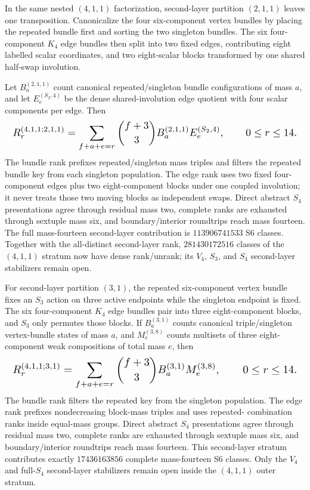 \documentclass{article}
\newcommand{\fitmath}[1]{\resizebox{0.99\linewidth}{!}{$\displaystyle #1$}}
\begin{document}
In the same nested $(4,1,1)$ factorization, second-layer partition
$(2,1,1)$ leaves one transposition. Canonicalize the four six-component vertex
bundles by placing the repeated bundle first and sorting the two singleton
bundles. The six four-component $K_4$ edge bundles then split into two fixed
edges, contributing eight labelled scalar coordinates, and two eight-scalar
blocks transformed by one shared half-swap involution.

Let $B_a^{(2,1,1)}$ count canonical repeated/singleton bundle configurations of
mass $a$, and let $E_e^{(S_2,4)}$ be the dense shared-involution edge quotient
with four scalar components per edge. Then
\begin{equation}
  \fitmath{%
    R_r^{(4,1,1;2,1,1)}=
      \sum_{f+a+e=r}{f+3\choose3}
      B_a^{(2,1,1)}E_e^{(S_2,4)},
    \qquad 0\leq r\leq14.
  }
  \label{eq:optimization-crazy-sextuple-s6-s4-s2-bundle-ranking}
\end{equation}
The bundle rank prefixes repeated/singleton mass triples and filters the
repeated
bundle key from each singleton population. The edge rank uses two fixed
four-component edges plus two eight-component blocks under one coupled
involution; it never treats those two moving blocks as independent swaps.
Direct abstract $S_4$ presentations agree through residual mass two, complete
ranks are exhausted through sextuple mass six, and boundary/interior roundtrips
reach mass fourteen. The full mass-fourteen second-layer contribution is
$113906741533$ S6 classes. Together with the all-distinct second-layer rank,
$281430172516$ classes of the $(4,1,1)$ stratum now have dense rank/unrank; its
$V_4$, $S_3$, and $S_4$ second-layer stabilizers remain open.

For second-layer partition $(3,1)$, the repeated six-component vertex bundle
fixes an $S_3$ action on three active endpoints while the singleton endpoint is
fixed. The six four-component $K_4$ edge bundles pair into three eight-component
blocks, and $S_3$ only permutes those blocks. If $B_a^{(3,1)}$ counts canonical
triple/singleton vertex-bundle states of mass $a$, and $M_e^{(3,8)}$ counts
multisets of three eight-component weak compositions of total mass $e$, then
\begin{equation}
  \fitmath{%
    R_r^{(4,1,1;3,1)}=
      \sum_{f+a+e=r}{f+3\choose3}
      B_a^{(3,1)}M_e^{(3,8)},
    \qquad 0\leq r\leq14.
  }
  \label{eq:optimization-crazy-sextuple-s6-s4-s3-bundle-ranking}
\end{equation}
The bundle rank filters the repeated key from the singleton population. The
edge rank prefixes nondecreasing block-mass triples and uses repeated-
combination
ranks inside equal-mass groups. Direct abstract $S_4$ presentations agree
through residual mass two, complete ranks are exhausted through sextuple mass
six, and boundary/interior roundtrips reach mass fourteen. This second-layer
stratum contributes exactly $17436163856$ complete mass-fourteen S6 classes.
Only the $V_4$ and full-$S_4$ second-layer stabilizers remain open inside the
$(4,1,1)$ outer stratum.
\end{document}
